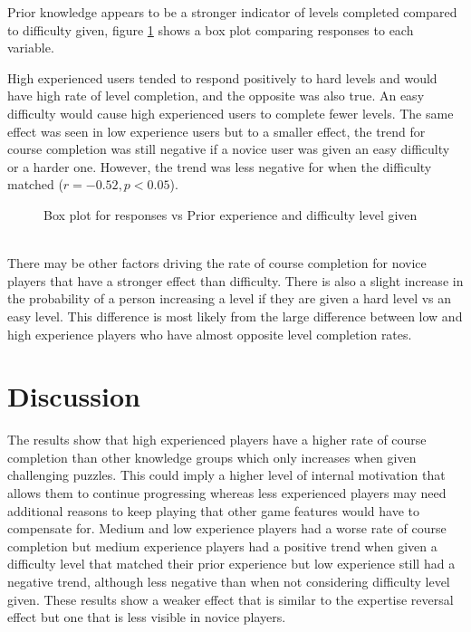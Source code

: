 \documentclass[letterpaper,man,natbib,floatsintext]{apa7}  %
\begin{document}
Prior knowledge appears to be a stronger indicator of levels completed compared to difficulty given, figure \ref{fig:dist_3} shows a box plot comparing responses to each variable.

High experienced users tended to respond positively to hard levels and would have high rate of level completion, and the opposite was also true. An easy difficulty would cause high experienced users to complete fewer levels. The same effect was seen in low experience users but to a smaller effect, the trend for course completion was still negative if a novice
user was given an easy difficulty or a harder one. However, the trend was less negative for when the difficulty matched
($r=-0.52, p < 0.05$). 
\begin{figure}[h!]
	\centering
	\caption{Box plot for responses vs Prior experience and difficulty level given}
	\label{fig:dist_3}
\end{figure}\\
There may be other factors driving the rate of course completion for novice players that have a
stronger effect than difficulty.
There is also a slight increase in the probability of a person increasing a level if they are given a hard level vs an easy level. This difference is most likely from the large difference between low and high experience players who have almost opposite
level completion rates.
\section{Discussion}
The results show that high experienced players have a higher rate of course completion than other knowledge groups 
which only increases when given challenging puzzles. This could imply a higher level of internal motivation that allows
them to continue progressing whereas less experienced players may need additional reasons to keep playing that other game features would have to compensate for. Medium and low experience players had a worse rate of course completion but medium experience players had a positive trend when given a difficulty level that matched their prior experience but low experience still had a negative trend, although less negative than when not considering difficulty level given. These results show a weaker effect that is similar to the expertise reversal effect but one that is less visible in novice 
players.
\end{document}
